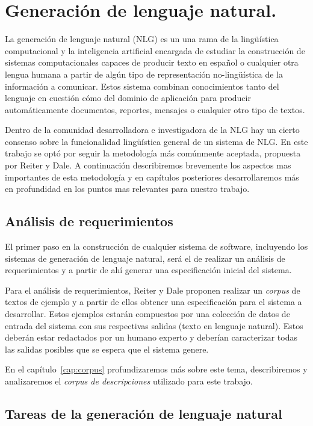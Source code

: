 \chapter{Generación de lenguaje natural.}
\label{cap:nlg_intro}
La generación de lenguaje natural (NLG) es un una rama de la lingüística computacional y la inteligencia artificial encargada de estudiar la construcción de sistemas computacionales capaces de producir texto en español o cualquier otra lengua humana a partir de algún tipo de representación no-lingüística de la información a comunicar. Estos sistema combinan conocimientos tanto del lenguaje en cuestión cómo del dominio de aplicación para producir automáticamente documentos, reportes, mensajes o cualquier otro tipo de textos.

Dentro de la comunidad desarrolladora e investigadora de la NLG hay un cierto consenso sobre la funcionalidad lingüística general de un sistema de NLG.
En este trabajo se optó por seguir la metodología más comúnmente aceptada, propuesta por Reiter y Dale\cite{reiterdale}.
A continuación describiremos brevemente los aspectos mas importantes de esta metodología y en capítulos posteriores desarrollaremos más en profundidad en los puntos mas relevantes para nuestro trabajo.

\section{Análisis de requerimientos}
El primer paso en la construcción de cualquier sistema de software, incluyendo los sistemas de generación de lenguaje natural, será el de realizar un análisis de requerimientos y a partir de ahí generar una especificación inicial del sistema. 

Para el análisis de requerimientos, Reiter y Dale proponen realizar un \emph{corpus} de textos de ejemplo y a partir de ellos obtener una especificación para el sistema a desarrollar. Estos ejemplos estarán compuestos por una colección de datos de entrada del sistema con sus respectivas salidas (texto en lenguaje natural). Estos deberán estar redactados por un humano experto y deberían caracterizar todas las salidas posibles que se espera que el sistema genere.

En el capítulo~\ref{cap:corpus} profundizaremos más sobre este tema, describiremos y analizaremos el \emph{corpus de descripciones} utilizado para este trabajo.

\section{Tareas de la generación de lenguaje natural}

